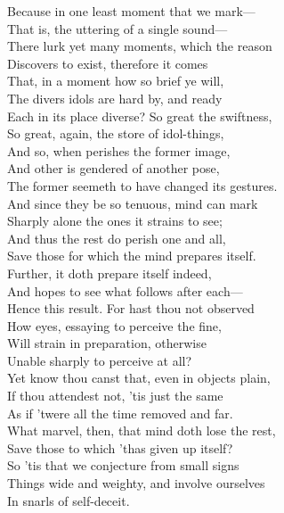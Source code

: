 Because in one least moment that we mark—\\
That is, the uttering of a single sound—\\
There lurk yet many moments, which the reason\\
Discovers to exist, therefore it comes\\
That, in a moment how so brief ye will,\\
The divers idols are hard by, and ready\\
Each in its place diverse? So great the swiftness,\\
So great, again, the store of idol-things,\\
And so, when perishes the former image,\\
And other is gendered of another pose,\\
The former seemeth to have changed its gestures.\\
And since they be so tenuous, mind can mark\\
Sharply alone the ones it strains to see;\\
And thus the rest do perish one and all,\\
Save those for which the mind prepares itself.\\
Further, it doth prepare itself indeed,\\
And hopes to see what follows after each—\\
Hence this result. For hast thou not observed\\
How eyes, essaying to perceive the fine,\\
Will strain in preparation, otherwise\\
Unable sharply to perceive at all?\\
Yet know thou canst that, even in objects plain,\\
If thou attendest not, 'tis just the same\\
As if 'twere all the time removed and far.\\
What marvel, then, that mind doth lose the rest,\\
Save those to which 'thas given up itself?\\
So 'tis that we conjecture from small signs\\
Things wide and weighty, and involve ourselves\\
In snarls of self-deceit.



